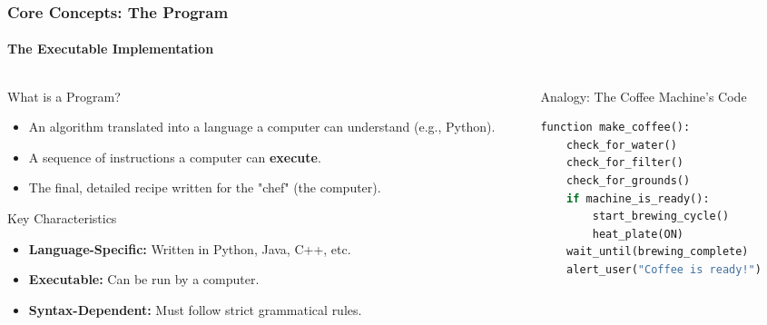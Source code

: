 \documentclass{beamer}
\begin{document}
\begin{frame}[fragile]
    \frametitle{Core Concepts: The Program}
    \framesubtitle{The Executable Implementation}
    
    \begin{columns}[T]
        \begin{column}{0.5\textwidth}
            \begin{block}{What is a Program?}
                \begin{itemize}
                    \item An algorithm translated into a language a computer can understand (e.g., Python).
                    \item A sequence of instructions a computer can \textbf{execute}.
                    \item The final, detailed recipe written for the "chef" (the computer).
                \end{itemize}
            \end{block}
            
            \begin{block}{Key Characteristics}
                \begin{itemize}
                    \item \textbf{Language-Specific:} Written in Python, Java, C++, etc.
                    \item \textbf{Executable:} Can be run by a computer.
                    \item \textbf{Syntax-Dependent:} Must follow strict grammatical rules.
                \end{itemize}
            \end{block}
        \end{column}
        \begin{column}{0.5\textwidth}
            \begin{block}{Analogy: The Coffee Machine's Code}
                \begin{lstlisting}[language=Python, caption={A program based on our coffee algorithm (pseudo-code).}, label=lst:coffee]
function make_coffee():
    check_for_water()
    check_for_filter()
    check_for_grounds()
    if machine_is_ready():
        start_brewing_cycle()
        heat_plate(ON)
    wait_until(brewing_complete)
    alert_user("Coffee is ready!")
                \end{lstlisting}
            \end{block}
        \end{column}
    \end{columns}
\end{frame}
\end{document}
